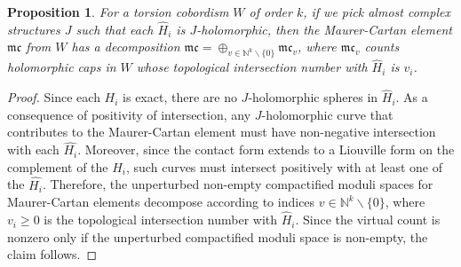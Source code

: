 \documentclass[11pt]{amsart}
\numberwithin{equation}{section}
\newtheorem{proposition}[theorem]{\textbf{Proposition}}
\def\N{{\mathbb N}}
\def\mc{{\mathfrak {mc}}}
\begin{document}
\begin{proposition}\label{prop:mc_intersection}
    For a torsion cobordism $W$ of order $k$, if we pick almost complex structures $J$ such that each $\widehat{H}_i$ is $J$-holomorphic, then the Maurer-Cartan element $\mc$ from $W$ has a decomposition $\mc = \oplus_{v\in \N^k\backslash\{0\}}\mc_v$, where $\mc_v$ counts holomorphic caps in $W$ whose topological intersection number with $\widehat{H}_i$ is $v_i$.
\end{proposition}
\begin{proof}
    Since each $H_i$ is exact, there are no $J$-holomorphic spheres in $\widehat{H}_i$. As a consequence of positivity of intersection, any $J$-holomorphic curve that contributes to the Maurer-Cartan element must have non-negative intersection with each $\widehat{H_i}$. Moreover, since the contact form extends to a Liouville form on the complement of the $H_i$, such curves must intersect positively with at least one of the $\widehat{H_i}$. Therefore, the unperturbed non-empty compactified moduli spaces for Maurer-Cartan elements decompose according to indices $v\in \N^k\backslash\{0\}$, where $v_i\ge 0$ is the topological intersection number with $\widehat{H}_i$. Since the virtual count is nonzero only if the unperturbed compactified moduli space is non-empty, the claim follows.
\end{proof}
\end{document}
